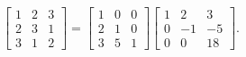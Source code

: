 \[\begin{bmatrix}1&2&3\\
2&3&1\\
3&1&2\end{bmatrix}=\begin{bmatrix}1&0&0\\
2&1&0\\
3&5&1\end{bmatrix}\begin{bmatrix}1&2&3\\
0&-1&-5\\
0&0&18\end{bmatrix}.\]